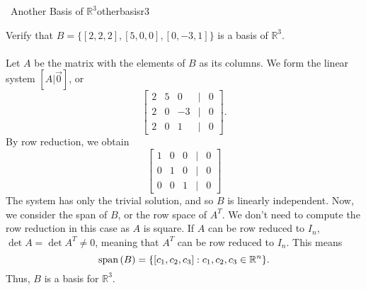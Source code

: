            \pagebreak
            \begin{example}{\Difficulty\,\Difficulty\,\,Another Basis of \(\mathbb{R}^3\)}{otherbasisr3}

                Verify that \(B=\{[2,2,2],[5,0,0],[0,-3,1]\}\) is a basis of \(\mathbb{R}^3\).
                \\
                \\
                Let \(A\) be the matrix with the elements of \(B\) as its columns. We form the linear system \([A|\vec{0}]\), or
                \begin{equation*}
                    \begin{bmatrix}
                        2 & 5 & 0 & | & 0 \\
                        2 & 0 & -3 & | & 0 \\
                        2 & 0 & 1 & | & 0
                    \end{bmatrix}.
                \end{equation*}
                By row reduction, we obtain
                \begin{equation*}
                    \begin{bmatrix}
                        1 & 0 & 0 & | & 0 \\
                        0 & 1 & 0 & | & 0 \\
                        0 & 0 & 1 & | & 0
                    \end{bmatrix}
                \end{equation*}
                The system has only the trivial solution, and so \(B\) is linearly independent. Now, we consider the span of \(B\), or the row space of \(A^T\). We don't need to compute the row reduction in this case as \(A\) is square. If \(A\) can be row reduced to \(I_n\), \(\det A=\det A^T \neq 0\), meaning that \(A^T\) can be row reduced to \(I_n\). This means
                \begin{equation*}
                    \text{span\,}(B)=\{[c_1,c_2,c_3]:c_1,c_2,c_3\in\mathbb{R}^n\}.
                \end{equation*}
                Thus, \(B\) is a basis for \(\mathbb{R}^3\).
            \end{example}
